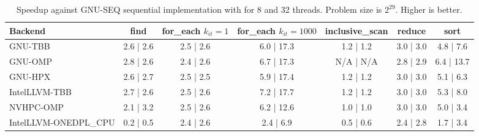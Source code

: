 \documentclass[sigconf]{acmart}
\begin{document}
\begin{table}[t]
      \centering
      \centering
      \caption{Speedup against GNU-SEQ sequential implementation with for 8 and 32 threads. Problem size is $2^{29}$. Higher is better.}\label{tab:summary_speedup}
      \begin{tabular}{l c c c c c c}
            \hline
            \textbf{Backend}      & \textbf{find} & \makecell{\textbf{for\_each}                                                   \\$k_{it}=1$} & \makecell{\textbf{for\_each}\\$k_{it}=1000$} & \textbf{inclusive\_scan} & \textbf{reduce} & \textbf{sort} \\
            \hline
            GNU-TBB               & 2.6 | 2.6     & 2.5 | 2.6                    & 6.0 | 17.3 & 1.2 | 1.2 & 3.0 | 3.0 & 4.8 | 7.6  \\
            GNU-OMP               & 2.8 | 2.6     & 2.4 | 2.6                    & 6.7 | 17.3 & N/A | N/A & 2.8 | 2.9 & 6.4 | 13.7 \\
            GNU-HPX               & 2.6 | 2.7     & 2.5 | 2.5                    & 5.9 | 17.4 & 1.2 | 1.2 & 3.0 | 3.0 & 5.1 | 6.3  \\
            IntelLLVM-TBB         & 2.7 | 2.6     & 2.5 | 2.6                    & 7.2 | 17.7 & 1.2 | 1.2 & 3.0 | 3.0 & 5.3 | 8.0  \\
            NVHPC-OMP             & 2.1 | 3.2     & 2.5 | 2.6                    & 6.2 | 12.6 & 1.0 | 1.0 & 3.0 | 3.0 & 5.0 | 3.4  \\
            IntelLLVM-ONEDPL\_CPU & 0.2 | 0.5     & 2.4 | 2.6                    & 2.4 | 6.9  & 0.5 | 0.6 & 2.4 | 2.8 & 1.7 | 3.4  \\
            \hline
      \end{tabular}
\end{table}
\end{document}
